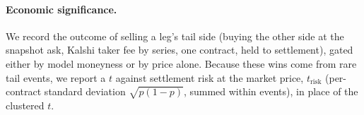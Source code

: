 \paragraph{Economic significance.}
We record the outcome of selling a leg's tail side (buying the other side at the snapshot ask,
Kalshi taker fee by series, one contract, held to settlement), gated either by model moneyness or
by price alone. Because these wins come from rare tail events, we report a $t$ against settlement
risk at the market price, $t_{\text{risk}}$ (per-contract standard deviation $\sqrt{p(1-p)}$,
summed within events), in place of the clustered $t$.

